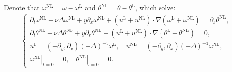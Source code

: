 \documentclass[reqno, 12pt]{amsart} %
\theoremstyle{plain} %
\newtheorem{Cor}[Thm]{Corollary}
\theoremstyle{definition}
\theoremstyle{remark}
\numberwithin{equation}{section} %
\newcommand{\px}{\partial_x}
\begin{document}
	Denote that $\omega^{\mathrm{NL}}=\omega-\omega^{\mathrm{L}}$ and $\theta^{\mathrm{NL}}=\theta-\theta^{\mathrm{L}}$, which solve:
	\begin{align} \label{eq:nonlinear part}
		\left\{\begin{array}{l}
			\partial_t \omega^{\mathrm{NL}}-\nu \Delta \omega^{\mathrm{NL}}+y \partial_x \omega^{\mathrm{NL}}+\left(u^{\mathrm{L}}+u^{\mathrm{NL}}\right) \cdot \nabla\left(\omega^{\mathrm{L}}+\omega^{\mathrm{NL}}\right)=\px \theta^{\mathrm{NL}},  \\
			\partial_t \theta^{\mathrm{NL}}-\nu \Delta \theta^{\mathrm{NL}}+y \partial_x \theta^{\mathrm{NL}}+\left(u^{\mathrm{L}}+u^{\mathrm{NL}}\right) \cdot \nabla\left(\theta^{\mathrm{L}}+\theta^{\mathrm{NL}}\right)=0, \\
			u^{\mathrm{L}}=\left(-\partial_y, \partial_x\right)(-\Delta)^{-1} \omega^{\mathrm{L}}, \quad u^{\mathrm{NL}}=\left(-\partial_y, \partial_x\right)(-\Delta)^{-1} \omega^{\mathrm{NL}}, \\
			\left.\omega^{\mathrm{NL}}\right|_{t=0}=0,\quad \left.\theta^{\mathrm{NL}}\right|_{t=0}=0.
		\end{array}\right.
	\end{align}
	
\end{document}
